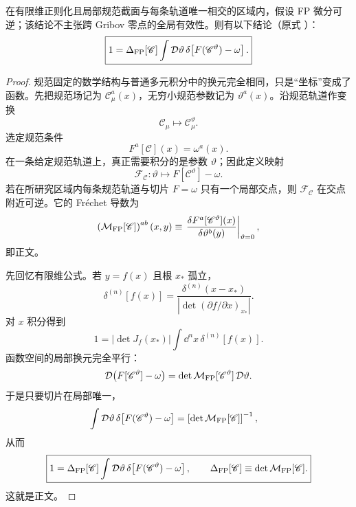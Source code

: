 \begin{proposition}
在有限维正则化且局部规范截面与每条轨道唯一相交的区域内，假设 FP 微分可逆；该结论不主张跨 Gribov 零点的全局有效性。则有以下结论（原式 ）：
\begin{equation*}
 \boxed{
 1=\Delta_{\rm FP}[\mathscr C]
 \int\mathcal D\vartheta\,
 \delta\!\left[F(\mathscr C^\vartheta)-\omega\right].}
\end{equation*}
\end{proposition}
\begin{proof}
规范固定的数学结构与普通多元积分中的换元完全相同，只是“坐标”变成了函数。先把规范场记为 \(\mathscr C_\mu^a(x)\)，无穷小规范参数记为 \(\vartheta^a(x)\)。沿规范轨道作变换
\[
\mathscr C_\mu
\longmapsto
\mathscr C_\mu^\vartheta .
\]
选定规范条件
\[
F^a[\mathscr C](x)=\omega^a(x).
\]
在一条给定规范轨道上，真正需要积分的是参数 \(\vartheta\)；因此定义映射
\[
\mathcal F_{\mathscr C}:
\vartheta
\longmapsto
F[\mathscr C^\vartheta]-\omega .
\]
若在所研究区域内每条规范轨道与切片 \(F=\omega\) 只有一个局部交点，则
\(\mathcal F_{\mathscr C}\) 在交点附近可逆。它的 Fr\'echet 导数为
\[
\left(
\mathcal M_{\rm FP}[\mathscr C]
\right)^{ab}(x,y)
\equiv
\left.
\frac{\delta F^a[\mathscr C^\vartheta](x)}
{\delta\vartheta^b(y)}
\right|_{\vartheta=0},
\]
即正文。

先回忆有限维公式。若 \(y=f(x)\) 且根 \(x_*\) 孤立，
\[
\delta^{(n)}[f(x)]
=
\frac{\delta^{(n)}(x-x_*)}
{|\det(\partial f/\partial x)_{x_*}|}.
\]
对 \(x\) 积分得到
\[
1
=
|\det J_f(x_*)|
\int\dd^n x\,\delta^{(n)}[f(x)].
\]
函数空间的局部换元完全平行：
\[
\mathcal D\!\left(F[\mathscr C^\vartheta]-\omega\right)
=
\det\mathcal M_{\rm FP}[\mathscr C^\vartheta]\,
\mathcal D\vartheta .
\]
于是只要切片在局部唯一，
\begin{align*}
\int\mathcal D\vartheta\,
\delta\!\left[F(\mathscr C^\vartheta)-\omega\right]
&=
\left[
\det\mathcal M_{\rm FP}[\mathscr C]
\right]^{-1},
\end{align*}
从而
\[
\boxed{
1
=
\Delta_{\rm FP}[\mathscr C]
\int\mathcal D\vartheta\,
\delta\!\left[
F(\mathscr C^\vartheta)-\omega
\right],
\qquad
\Delta_{\rm FP}[\mathscr C]
\equiv
\det\mathcal M_{\rm FP}[\mathscr C].
}
\]
这就是正文。


\end{proof}
